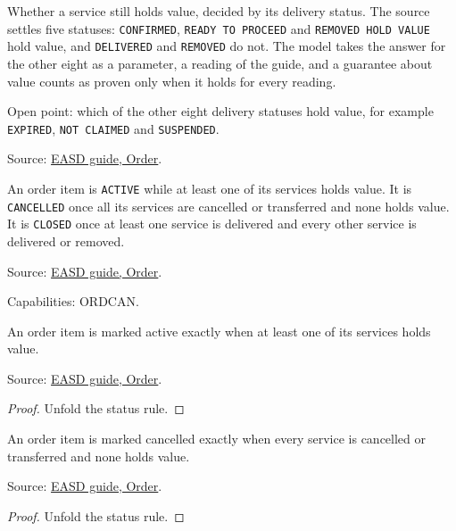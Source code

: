 \begin{definition}
  \label{def:c05-holds-value}
  Whether a service still holds value, decided by its delivery status.  The
  source settles five statuses: \texttt{CONFIRMED}, \texttt{READY TO PROCEED}
  and \texttt{REMOVED HOLD VALUE} hold value, and \texttt{DELIVERED} and
  \texttt{REMOVED} do not.  The model takes the answer for the other eight as a
  parameter, a reading of the guide, and a guarantee about value counts as
  proven only when it holds for every reading.

  Open point: which of the other eight delivery statuses hold value, for
  example \texttt{EXPIRED}, \texttt{NOT CLAIMED} and \texttt{SUSPENDED}.

  Source: \href{https://standards.atlassian.net/wiki/spaces/EASD/pages/574849062/Order}{EASD guide, Order}.
\end{definition}

\begin{definition}
  \label{def:c06-item-status}
  An order item is \texttt{ACTIVE} while at least one of its services holds
  value.  It is \texttt{CANCELLED} once all its services are cancelled or
  transferred and none holds value.  It is \texttt{CLOSED} once at least one
  service is delivered and every other service is delivered or removed.

  Source: \href{https://standards.atlassian.net/wiki/spaces/EASD/pages/574849062/Order}{EASD guide, Order}.

  Capabilities: ORDCAN.
\end{definition}

\begin{theorem}
  \label{thm:one-item-active}
  An order item is marked active exactly when at least one of its services
  holds value.

  Source: \href{https://standards.atlassian.net/wiki/spaces/EASD/pages/574849062/Order}{EASD guide, Order}.
\end{theorem}
\begin{proof}
  Unfold the status rule.
\end{proof}

\begin{theorem}
  \label{thm:one-item-cancelled}
  An order item is marked cancelled exactly when every service is cancelled
  or transferred and none holds value.

  Source: \href{https://standards.atlassian.net/wiki/spaces/EASD/pages/574849062/Order}{EASD guide, Order}.
\end{theorem}
\begin{proof}
  Unfold the status rule.
\end{proof}

